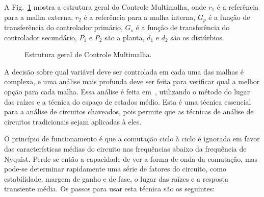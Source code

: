     A Fig.~\ref{fig:multiloop} mostra a estrutura geral do Controle Multimalha, onde
    $r_1$ é a referência para a malha externa, $r_2$ é a referência para a malha
    interna, $G_p$ é a função de transferência do controlador primário,
    $G_s$ é a função de transferência do controlador secundário, $P_1$ e $P_2$
    são a planta, $d_1$ e $d_2$ são os distúrbios.


    \begin{figure}[htb]
        \renewcommand\figurename{Fig.}
        \caption{Estrutura geral de Controle Multimalha.}
        \label{fig:multiloop}
    \end{figure}

    A decisão sobre qual variável deve ser controlada em cada uma das malhas é complexa,
    e uma análise mais profunda deve ser feita para verificar qual a melhor
    opção para cada malha. Essa análise é feita em~\cite{ref:NASER}, utilizando o
    método do lugar das raízes e a técnica do espaço de estados médio. Esta é uma técnica
    essencial para a análise de circuitos chaveados, pois permite que as técnicas de
    análise de circuitos tradicionais sejam aplicadas à eles.

    O princípio de funcionamento é que a comutação ciclo à ciclo é ignorada em
    favor das características médias do circuito nas frequências abaixo da
    frequência de Nyquist. Perde-se então a capacidade de ver a forma de onda
    da comutação, mas pode-se determinar rapidamente uma série de fatores
    do circuito, como estabilidade, margem de ganho e de fase, o lugar das
    raízes e a resposta transiente média. Os passos para usar esta técnica são
    os seguintes:

